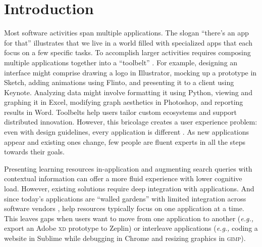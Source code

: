 \section{Introduction}
Most software activities span multiple applications. The slogan ``there's an app for that'' illustrates that we live in a world filled with specialized apps that each focus on a few specific tasks. To accomplish larger activities requires composing multiple applications together into a ``toolbelt'' \cite{Sumner1997}. For example, designing an interface might comprise drawing a logo in Illustrator, mocking up a prototype in Sketch, adding animations using Flinto, and presenting it to a client using Keynote. Analyzing data might involve formatting it using Python, viewing and graphing it in Excel, modifying graph aesthetics in Photoshop, and reporting results in Word. Toolbelts help users tailor custom ecosystems and support distributed innovation. However, this bricolage creates a user experience problem: even with design guidelines, every application is different \cite{Beaudouin-Lafon2018}. As new applications appear and existing ones change, few people are fluent experts in all the steps towards their goals.

Presenting learning resources in-application \cite{Grossman2010a, Chilana2012, Matejka2011a, Matejka2011, Brandt2010, Ichinco2017} and augmenting search queries with contextual information \cite{Ekstrand2011, Brandt2010} can offer a more fluid experience with lower cognitive load. However, existing solutions require deep integration with applications. And since today's applications are ``walled gardens''  with limited integration across software vendors \cite{Beaudouin-Lafon2018}, help resources typically focus on one application at a time. This leaves gaps when users want to move from one application to another (\textit{e.g.,} export an Adobe \textsc{xd} prototype to Zeplin) or interleave applications (\textit{e.g.,} coding a website in Sublime while debugging in Chrome and resizing graphics in \textsc{gimp}). 


